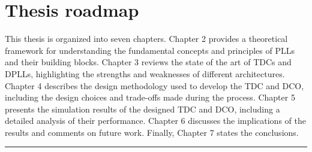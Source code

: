\section{Thesis roadmap}
This thesis is organized into seven chapters. Chapter 2 provides a theoretical framework for understanding the fundamental concepts and principles of PLLs and their building blocks. Chapter 3 reviews the state of
the art of TDCs and DPLLs, highlighting the strengths and weaknesses of different architectures. Chapter 4 describes the design methodology used to develop the TDC and DCO, including the design choices and
trade-offs made during the process. Chapter 5 presents the simulation results of the designed TDC and DCO, including a detailed analysis of their performance. Chapter 6 discusses the implications of the results
and comments on future work. Finally, Chapter 7 states the conclusions.

\noindent\rule{\textwidth}{1pt}

\printbibliography[heading=subbibintoc]